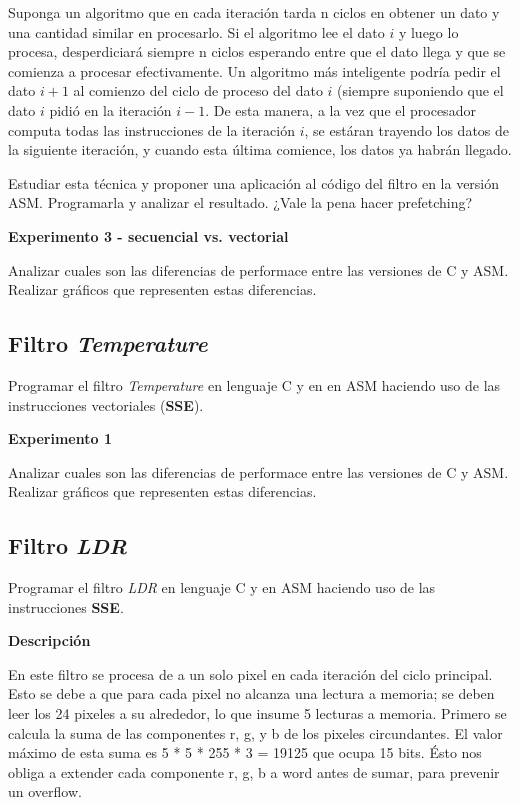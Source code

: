   Suponga un algoritmo que en cada iteración tarda n ciclos en obtener un dato y una cantidad
  similar en procesarlo. Si el algoritmo lee el dato $i$ y luego lo procesa,
  desperdiciará siempre n ciclos esperando entre que el dato llega y que se comienza
  a procesar efectivamente. Un algoritmo más inteligente podría pedir el 
  dato $i+1$ al comienzo del ciclo de proceso del dato $i$ (siempre suponiendo
  que el dato $i$ pidió en la iteración $i-1$. De esta manera, a la vez que el
  procesador computa todas las instrucciones de la iteración $i$, se estáran trayendo
  los datos de la siguiente iteración, y cuando esta última comience, los datos ya
  habrán llegado.

  \vspace*{0.2cm}
  Estudiar esta técnica y proponer una aplicación al código del filtro en la versión ASM.
  Programarla y analizar el resultado. ¿Vale la pena hacer prefetching?

\vspace*{0.3cm} \noindent
\textbf{Experimento 3 - secuencial vs. vectorial}

  Analizar cuales son las diferencias de performace entre las versiones de C y ASM. 
  Realizar gráficos que representen estas diferencias.


\subsection*{Filtro \textit{Temperature}}

  Programar el filtro \textit{Temperature} en lenguaje C y en en ASM haciendo uso de 
  las instrucciones vectoriales (\textbf{SSE}).


\vspace*{0.3cm} \noindent
\textbf{Experimento 1}

  Analizar cuales son las diferencias de performace entre las versiones de C y ASM. 
  Realizar gráficos que representen estas diferencias.



\subsection*{Filtro \textit{LDR}}
  Programar el filtro \textit{LDR} en lenguaje C y en
  ASM haciendo uso de las instrucciones \textbf{SSE}.

\vspace*{0.3cm} \noindent
\textbf{Descripción}

En este filtro se procesa de a un solo pixel en cada iteración del ciclo principal. Esto se debe a que para cada pixel no alcanza una lectura a
memoria; se deben leer los 24 pixeles a su alrededor, lo que insume 5 lecturas a memoria.
Primero se calcula la suma de las componentes r, g, y b de los pixeles circundantes. El valor máximo de esta suma es 5 * 5 * 255 * 3 = 19125 que 
ocupa 15 bits. Ésto nos obliga a extender cada componente r, g, b a word antes de sumar, para prevenir un overflow.

